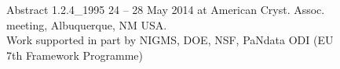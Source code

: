 \documentclass[11pt]{a0poster}
\begin{document}
\begin{minipage}[]{0.01\linewidth}~\end{minipage}\hfill\begin{minipage}[]{0.29\linewidth}
\fontsize{18}{22}\selectfont
\begin{figure}[H]
\vspace{-15mm}
\begin{center}
      {
\fontsize{16}{20}\selectfont ~~\\
Abstract 1.2.4\_1995
24 -- 28 May 2014 at American Cryst. Assoc. meeting, Albuquerque, NM USA.\\
Work supported in part by NIGMS, DOE, NSF, PaNdata ODI (EU 7th Framework Programme)}
\end{center}
\end{figure}

\vspace{1mm}

\fontsize{18}{22}\selectfont%


\end{minipage}
\end{document}
